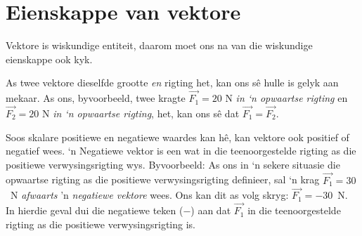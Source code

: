 \section{Eienskappe van vektore}
    \nopagebreak
    \label{m38813*cid7}
      \label{m38813*id188277}

Vektore is wiskundige entiteit, daarom moet ons na van die wiskundige eienskappe ook kyk.

As twee vektore dieselfde grootte \textit{en} rigting het, kan ons sê hulle is gelyk aan mekaar. As ons, byvoorbeeld, twee kragte  $\stackrel{\to }{F_{1}} = 20$ N \textit{in ‘n opwaartse rigting} en $\stackrel{\to }{F_{2}} = 20$ N \textit{in ‘n opwaartse rigting}, het, kan ons s\^{e} dat $\stackrel{\to }{F_{1}} = \stackrel{\to }{F_{2}}$.



Soos skalare positiewe en negatiewe waardes kan hê, kan vektore ook positief of negatief wees. ‘n Negatiewe vektor is een wat in die teenoorgestelde rigting as die positiewe verwysingsrigting wys. Byvoorbeeld: As ons in ‘n sekere situasie die opwaartse rigting as die positiewe verwysingsrigting definieer, sal ‘n krag $\stackrel{\to }{F_{1}} = 30$~N \textit{afwaarts} 'n \textit{negatiewe vektore} wees. Ons kan dit as volg skryg: $\stackrel{\to }{F_{1}} = -30$~N. In hierdie geval dui die negatiewe teken ($-$) aan dat $\stackrel{\to }{F_{1}}$ in die teenoorgestelde rigting as die positiewe verwysingsrigting is.


